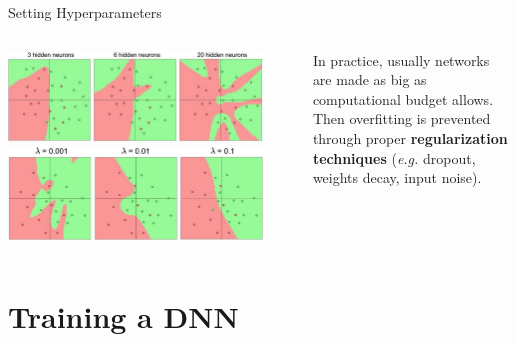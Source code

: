 \documentclass[aspectratio=169]{beamer}
\begin{document}

\begin{frame}{Setting Hyperparameters}
\begin{columns}
\begin{column}{0.6\textwidth}
\includegraphics[width=0.9\textwidth]{img/dnn/dnn_overfit.jpg}\\
\includegraphics[width=0.9\textwidth]{img/dnn/dnn_overfit_reg.jpg}
\end{column}
\begin{column}{0.4\textwidth}
In practice, usually networks are made as big as computational budget allows.\\
\vspace{0.5cm}
Then overfitting is prevented through proper \textbf{regularization techniques} (\emph{e.g.} dropout, weights decay, input noise).
\end{column}
\end{columns}
\end{frame}


\section{Training a DNN}


\end{document}
